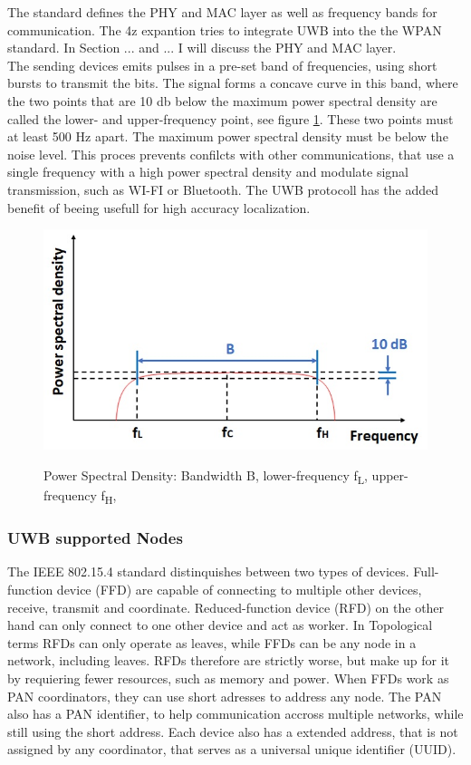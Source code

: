 The standard defines the PHY and MAC layer as well as frequency bands for communication.
The 4z expantion tries to integrate UWB into the the WPAN standard. In Section ... and ... I will discuss the PHY and MAC layer.\\

The sending devices emits pulses in a pre-set band of frequencies, using short bursts to transmit the bits.
The signal forms a concave curve in this band, where the two points that are 10 db below the maximum power spectral density are called the lower- and upper-frequency point, see figure \ref{f:UWB_spectrum}.
These two points must at least 500 Hz apart.
The maximum power spectral density must be below the noise level.
This proces prevents confilcts with other communications, that use a single frequency with a high power spectral density and modulate signal transmission, such as WI-FI or Bluetooth.
The UWB protocoll has the added benefit of beeing usefull for high accuracy localization.


\begin{figure}[ht!]
\centering
 \caption{Power Spectral Density: Bandwidth B, lower-frequency f\textsubscript{L}, upper-frequency f\textsubscript{H}, \cite{hsu_2021}}
\includegraphics[width=\linewidth]{graphics/UWB_spectrum.jpg}
\label{f:UWB_spectrum}
\end{figure}


\subsubsection{UWB supported Nodes}

The IEEE 802.15.4 standard distinquishes between two types of devices.
Full-function device (FFD) are capable of connecting to multiple other devices, receive, transmit and coordinate. Reduced-function device (RFD) on the other hand can only connect to one other device and act as worker. 
In Topological terms RFDs can only operate as leaves, while FFDs can be any node in a network, including leaves.
RFDs therefore are strictly worse, but make up for it by requiering fewer resources, such as memory and power.
When FFDs work as PAN coordinators, they can use short adresses to address any node.
The PAN also has a PAN identifier, to help communication accross multiple networks, while still using the short address.
Each device also has a extended address, that is not assigned by any coordinator, that serves as a universal unique identifier (UUID).


